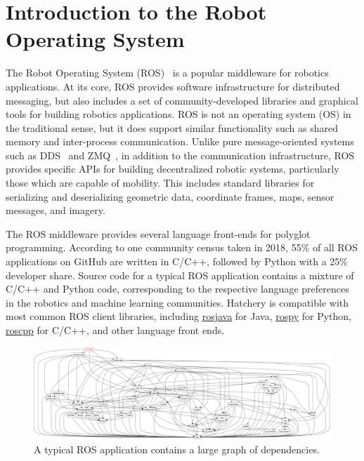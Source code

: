 \documentclass[12pt,initial,twoside,maitrise]{dms}
\numberwithin{equation}{section}
\numberwithin{table}{chapter}
\numberwithin{figure}{chapter}
\begin{document}
\section{Introduction to the Robot Operating System}

The Robot Operating System (ROS)~\citep{quigley2009ros} is a popular middleware for robotics applications. At its core, ROS provides software infrastructure for distributed messaging, but also includes a set of community-developed libraries and graphical tools for building robotics applications. ROS is not an operating system (OS) in the traditional sense, but it does support similar functionality such as shared memory and inter-process communication. Unlike pure message-oriented systems such as DDS~\citep{pardo2003omg} and ZMQ~\citep{hintjens2013zeromq}, in addition to the communication infrastructure, ROS provides specific APIs for building decentralized robotic systems, particularly those which are capable of mobility. This includes standard libraries for serializing and deserializing geometric data, coordinate frames, maps, sensor messages, and imagery.

The ROS middleware provides several language front-ends for polyglot programming. According to one community census taken in 2018, 55\% of all ROS applications on GitHub are written in C/C++, followed by Python with a 25\%~\citep{Areserio54:online} developer share. Source code for a typical ROS application contains a mixture of C/C++ and Python code, corresponding to the respective language preferences in the robotics and machine learning communities. Hatchery is compatible with most common ROS client libraries, including \href{http://wiki.ros.org/rosjava}{rosjava} for Java, \href{http://wiki.ros.org/rospy}{rospy} for Python, \href{http://wiki.ros.org/rospy}{roscpp} for C/C++, and other language front ends.

\begin{figure}
\centering
\includegraphics[width=\textwidth]{../figures/rqt_dep_graph.png}
\caption{A typical ROS application contains a large graph of dependencies.}
\end{figure}
\end{document}
